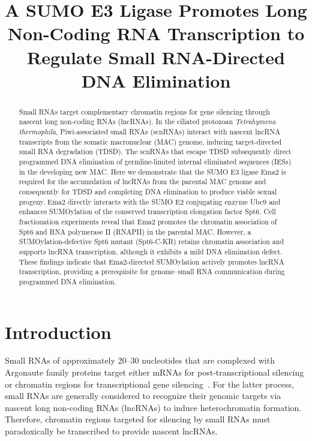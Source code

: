 \documentclass[12pt]{article}
\title{A SUMO E3 Ligase Promotes Long Non-Coding RNA Transcription to Regulate Small RNA-Directed DNA Elimination}
\author{}
\date{}
\begin{document}
\maketitle

\begin{abstract}
Small RNAs target complementary chromatin regions for gene silencing through nascent long non-coding RNAs (lncRNAs).
In the ciliated protozoan \textit{Tetrahymena thermophila}, Piwi-associated small RNAs (scnRNAs) interact with nascent lncRNA transcripts from the somatic macronuclear (MAC) genome, inducing target-directed small RNA degradation (TDSD).
The scnRNAs that escape TDSD subsequently direct programmed DNA elimination of germline-limited internal eliminated sequences (IESs) in the developing new MAC.
Here we demonstrate that the SUMO E3 ligase Ema2 is required for the accumulation of lncRNAs from the parental MAC genome and consequently for TDSD and completing DNA elimination to produce viable sexual progeny.
Ema2 directly interacts with the SUMO E2 conjugating enzyme Ubc9 and enhances SUMOylation of the conserved transcription elongation factor Spt6.
Cell fractionation experiments reveal that Ema2 promotes the chromatin association of Spt6 and RNA polymerase II (RNAPII) in the parental MAC.
However, a SUMOylation-defective Spt6 mutant (Spt6-C-KR) retains chromatin association and supports lncRNA transcription, although it exhibits a mild DNA elimination defect.
These findings indicate that Ema2-directed SUMOylation actively promotes lncRNA transcription, providing a prerequisite for genome--small RNA communication during programmed DNA elimination.
\end{abstract}

\section{Introduction}

Small RNAs of approximately 20--30 nucleotides that are complexed with Argonaute family proteins target either mRNAs for post-transcriptional silencing or chromatin regions for transcriptional gene silencing~\citep{Holoch2015, Wilson2013}.
For the latter process, small RNAs are generally considered to recognize their genomic targets via nascent long non-coding RNAs (lncRNAs) to induce heterochromatin formation.
Therefore, chromatin regions targeted for silencing by small RNAs must paradoxically be transcribed to provide nascent lncRNAs.
\end{document}
